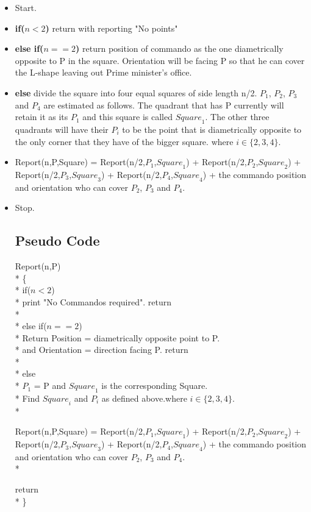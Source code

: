 \documentclass{article}
\begin{document}
\begin{itemize}
\item Start.
\item {\bf if($n<2$)} return with reporting "No points"
\item {\bf else if($n==2$)} return position of commando as the one diametrically opposite to P in the square. Orientation will be facing P so that he can cover the L-shape leaving out Prime minister's office.
\item {\bf else} divide the square into four equal squares of side length n/2. $P_1$, $P_2$, $P_3$ and $P_4$ are estimated as follows. The quadrant that has P currently will retain it as its $P_1$ and this square is called ${Square}_1$. The other three quadrants will have their $P_i$ to be the point that is diametrically opposite to the only corner that they have of the bigger square. where $ i \in \{2,3,4\} $.
\item Report(n,P,Square) = Report(n/2,$P_1$,${Square}_1$) + Report(n/2,$P_2$,${Square}_2$) + Report(n/2,$P_3$,${Square}_3$) + Report(n/2,$P_4$,${Square}_4$) + the commando position and orientation who can cover $P_2$, $P_3$ and $P_4$. 
\item Stop.
\subsection{Pseudo Code}
Report(n,P)	\\*
\{			\\*
	\hspace*{1cm}if($n<2$) \\*
	\hspace*{2cm} print "No Commandos required". return \\*
	\\*
	\hspace*{1cm}else if($n==2$)\\*
	\hspace*{2cm}Return Position =  diametrically opposite point to P. \\*
	\hspace*{2cm}and Orientation = direction facing P. return\\*
	\\*
	\hspace*{1cm}else \\*
	\hspace*{2cm}$P_1$ = P and ${Square}_1$ is the corresponding Square.\\*
	\hspace*{2cm}Find ${Square}_i$ and $P_i$ as defined above.where $ i \in \{2,3,4\} $.\\*
	\begin{center}
	Report(n,P,Square) = Report(n/2,$P_1$,${Square}_1$) + Report(n/2,$P_2$,${Square}_2$) + Report(n/2,$P_3$,${Square}_3$) + Report(n/2,$P_4$,${Square}_4$) + the commando position and orientation who can cover $P_2$, $P_3$ and $P_4$. \\*
	\end{center}
	\hspace*{1cm}return \\*
\}

\end{itemize}
\end{document}
